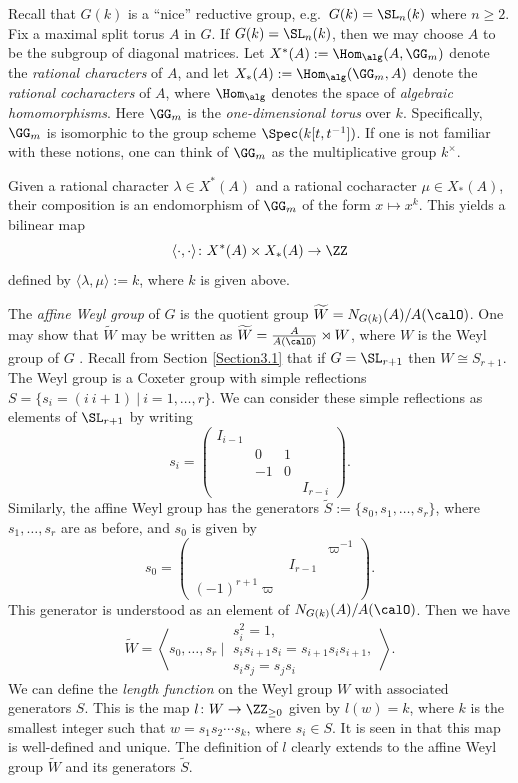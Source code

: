 \documentclass[11pt]{amsart}
\theoremstyle{remark}
\begin{document}
Recall that $G(k)$ is a ``nice'' reductive group, e.g.\ $G(k)=\SL_n(k)$ where $n\geq 2$.
Fix a maximal split torus $A$ in $G$.
If $G(k)=\SL_n(k)$, then we may choose $A$ to be the subgroup of diagonal matrices.
Let $X^\ast(A):=\Hom_\alg(A,\GG_m)$ denote the \emph{rational characters} of $A$, and let $X_\ast(A):= \Hom_\alg(\GG_m,A)$ denote the \emph{rational cocharacters} of $A$, where $\Hom_\alg$ denotes the space of \emph{algebraic homomorphisms}.
Here $\GG_m$ is the \emph{one-dimensional torus} over $k$.
Specifically, $\GG_m$ is isomorphic to the group scheme $\Spec(k[t,t^{-1}])$.
If one is not familiar with these notions, one can think of $\GG_m$ as the multiplicative group $k^\times$.

Given a rational character $\lambda\in X^\ast(A)$ and a rational cocharacter $\mu\in X_\ast(A)$, their composition is an endomorphism of $\GG_m$ of the form $x\mapsto x^k$.
This yields a bilinear map
\[
	\langle\cdot,\cdot\rangle\colon X^\ast(A)\times X_\ast(A)\to\ZZ
\]
defined by $\langle\lambda,\mu\rangle:=k$, where $k$ is given above.

The \emph{affine Weyl group} of $G$ is the quotient group $\widetilde{W} = N_{G(k)}(A)/A(\calO)$.
One may show that $\widetilde{W}$ may be written as $\widetilde{W} = \frac{A}{A(\calO)}\rtimes W$, where $W$ is the Weyl group of $G$ \cite{Humphreys90}.
Recall from Section \ref{Section3.1} that if $G=\SL_{r+1}$ then $W\cong S_{r+1}$.
The Weyl group is a Coxeter group with simple reflections $S=\{s_i = (i\ i+1)\ |\ i=1,\ldots, r\}$.
We can consider these simple reflections as elements of $\SL_{r+1}$ by writing
\[
	s_i = \begin{pmatrix}
		I_{i-1} &    &   &         \\
		        & 0  & 1 &         \\
		        & -1 & 0 &         \\
		        &    &   & I_{r-i}
	\end{pmatrix}.
\]
Similarly, the affine Weyl group has the generators $\widetilde{S} := \{s_0,s_1,\ldots, s_r\}$, where $s_1,\ldots, s_r$ are as before, and $s_0$ is given by
\[
	s_0 = \begin{pmatrix}
		                 &         & \varpi^{-1} \\
		                 & I_{r-1} &             \\
		(-1)^{r+1}\varpi &         &
	\end{pmatrix}.
\]
This generator is understood as an element of $N_{G(k)}(A)/A(\calO)$.
Then we have
\[
	\widetilde{W} = \left\langle s_0,\ldots, s_r\ \Bigg|\ \begin{array}{c}
		s_i^2 = 1,                         \\
		s_is_{i+1}s_i = s_{i+1}s_is_{i+1}, \\
		s_is_j=s_js_i\end{array}
	\right\rangle.
\]
We can define the \emph{length function} on the Weyl group $W$ with associated generators $S$.
This is the map $l\colon W\to\ZZ_{\geq 0}$ given by $l(w)=k$, where $k$ is the smallest integer such that $w=s_1s_2\cdots s_k$, where $s_i\in S$.
It is seen in \cite{Bump10} that this map is well-defined and unique.
The definition of $l$ clearly extends to the affine Weyl group $\widetilde{W}$ and its generators $\widetilde{S}$.
\end{document}
